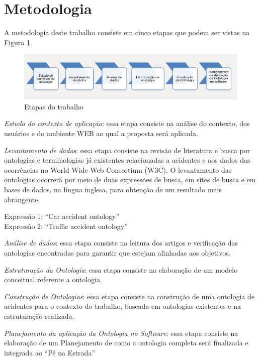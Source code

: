\section{Metodologia}

A metodologia deste trabalho consiste em cinco etapas que podem ser vistas na
Figura \ref{fig:metodologia}.

\graphicspath{{figuras/}}

\begin{figure}[!h]
 \centering
 \includegraphics[scale = 0.75]{metodologia}
 \caption{Etapas do trabalho}
 \label{fig:metodologia}

\end{figure}
\textit{Estudo do contexto de aplicação}: essa etapa consiste na análise do contexto, dos
usuários e do ambiente WEB ao qual a proposta será aplicada.

\textit{Levantamento de dados}: essa etapa consiste na revisão de literatura e busca por
ontologias e terminologias já existentes relacionadas a acidentes e aos dados das
ocorrências no World Wide Web Consortium (W3C). O levantamento das ontologias
ocorrerá por meio de duas expressões de busca, em sites de busca e em bases de dados, na
língua inglesa, para obtenção de um resultado mais abrangente.

\begin{center}
  Expressão 1: “Car accident ontology”\\
  Expressão 2: “Traffic accident ontology”
\end{center}


\textit{Análise de dados}: essa etapa consiste na leitura dos artigos e verificação das
ontologias encontradas para garantir que estejam alinhadas aos objetivos.

\textit{Estruturação da Ontologia}: essa etapa consiste na elaboração de um modelo conceitual
referente a ontologia.

\textit{Construção de Ontologias}: essa etapa consiste na construção de uma ontologia de
acidentes para o contexto do trabalho, baseada em ontologias existentes e na estruturação realizada.

\textit{Planejamento da aplicação da Ontologia no Software}: essa etapa consiste na elaboração de um Planejamento
de como a ontologia completa será finalizada e integrada ao ``Pé na Estrada''